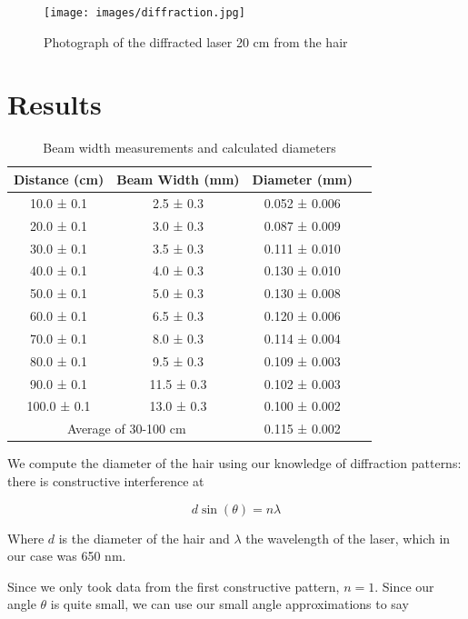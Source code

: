 \documentclass[12pt,letterpaper]{article}
\begin{document}
\begin{figure}[h]
    \centering
    \texttt{[image: images/diffraction.jpg]}
    \caption{Photograph of the diffracted laser 20 cm from the hair}
    \label{fig:setup}
\end{figure}

\section{Results}

\begin{table}[h]
\centering
\begin{tabular}{|c|c|c|c|}
\hline
Distance (cm) & Beam Width (mm) & Diameter (mm) \\
\hline
10.0 ± 0.1 & 2.5 ± 0.3 & 0.052 ± 0.006 \\
20.0 ± 0.1 & 3.0 ± 0.3 & 0.087 ± 0.009 \\
30.0 ± 0.1 & 3.5 ± 0.3 & 0.111 ± 0.010 \\
40.0 ± 0.1 & 4.0 ± 0.3 & 0.130 ± 0.010 \\
50.0 ± 0.1 & 5.0 ± 0.3 & 0.130 ± 0.008 \\
60.0 ± 0.1 & 6.5 ± 0.3 & 0.120 ± 0.006 \\
70.0 ± 0.1 & 8.0 ± 0.3 & 0.114 ± 0.004 \\
80.0 ± 0.1 & 9.5 ± 0.3 & 0.109 ± 0.003 \\
90.0 ± 0.1 & 11.5 ± 0.3 & 0.102 ± 0.003 \\
100.0 ± 0.1 & 13.0 ± 0.3 & 0.100 ± 0.002 \\
\hline
\multicolumn{2}{|c|}{Average of 30-100 cm} & 0.115 ± 0.002 \\
\hline
\end{tabular}
\caption{Beam width measurements and calculated diameters}
\label{tab:beam_measurements}
\end{table}

We compute the diameter of the hair using our knowledge of diffraction patterns: there is constructive interference at 

\begin{equation}
    d\sin(\theta)=n\lambda
\end{equation}

Where $d$ is the diameter of the hair and $\lambda$ the wavelength of the laser, which in our case was 650 nm.

Since we only took data from the first constructive pattern, $n=1$. Since our angle $\theta$ is quite small, we can use our small angle approximations to say
\end{document}
